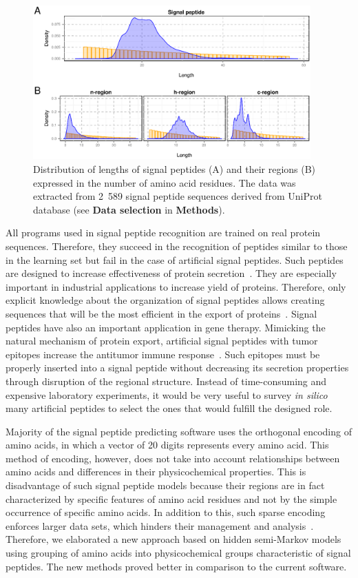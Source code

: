 \documentclass[10pt,letterpaper]{article}
\begin{document}
\begin{figure}[ht]\centering
\includegraphics[width=0.95\textwidth]{figures/reglen.eps}
\caption{Distribution of lengths of signal peptides (A) and their regions (B) expressed in the number of amino acid residues. The data was extracted from 2~589 signal peptide sequences derived from UniProt database (see \textbf{Data selection} in \textbf{Methods}).}
\label{fig:reglen}
\end{figure}

All programs used in signal peptide recognition are trained on real protein sequences. Therefore, they succeed in the recognition of peptides similar to those in the learning set but fail in the case of artificial signal peptides. Such peptides are designed to increase effectiveness of protein secretion~\cite{2010futatsumorisugaisignal}. They are especially important in industrial applications to increase yield of proteins. Therefore, only explicit knowledge about the organization of signal peptides allows creating sequences that will be the most efficient in the export of proteins~\cite{2013ngengineering}. Signal peptides have also an important application in gene therapy. Mimicking the natural mechanism of protein export, artificial signal peptides with tumor epitopes increase the antitumor immune response~\cite{2003heenhanced}. Such epitopes must be properly inserted into a signal peptide without decreasing its secretion properties through disruption of the regional structure. Instead of time-consuming and expensive laboratory experiments, it would be very useful to survey \textit{in silico} many artificial peptides to select the ones that would fulfill the designed role.

Majority of the signal peptide predicting software uses the orthogonal encoding of amino acids, in which a vector of 20 digits represents every amino acid. This method of encoding, however, does not take into account relationships between amino acids and differences in their physicochemical properties. This is disadvantage of such signal peptide models because their regions are in fact characterized by specific features of amino acid residues and not by the simple occurrence of specific amino acids. In addition to this, such sparse encoding enforces larger data sets, which hinders their management and analysis~\cite{2002linamino}. Therefore, we elaborated a new approach based on hidden semi-Markov models using grouping of amino acids into physicochemical groups characteristic of signal peptides. The new methods proved better in comparison to the current software.
\end{document}
